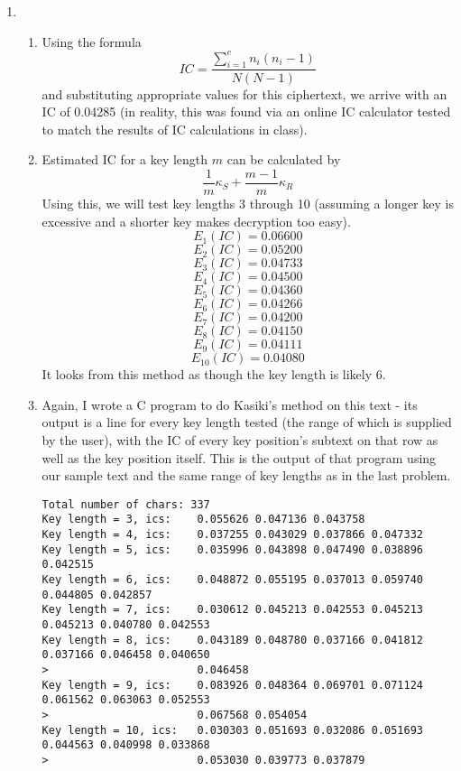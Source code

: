 \documentclass[10pt,letterpaper]{article}
\begin{document}
\begin{enumerate}
    \item
    \begin{enumerate}
        \item
            Using the formula
            $$IC = \frac{\sum_{i=1}^{c}n_i(n_i-1)}{N(N-1)}$$
            and substituting appropriate values for this ciphertext, we arrive with an IC of 0.04285 (in reality, this was found via an online IC calculator tested to match the results of IC calculations in class).
        \item
            Estimated IC for a key length $m$ can be calculated by
                $$\frac{1}{m}\kappa_S + \frac{m-1}{m}\kappa_R$$
            Using this, we will test key lengths 3 through 10 (assuming a longer key is excessive and a shorter key makes decryption too easy).
                $$E_1(IC) = 0.06600$$
                $$E_2(IC) = 0.05200$$
                $$E_3(IC) = 0.04733$$
                $$E_4(IC) = 0.04500$$
                $$E_5(IC) = 0.04360$$
                $$E_6(IC) = 0.04266$$
                $$E_7(IC) = 0.04200$$
                $$E_8(IC) = 0.04150$$
                $$E_9(IC) = 0.04111$$
                $$E_{10}(IC) = 0.04080$$
            It looks from this method as though the key length is likely 6.
        \item
            Again, I wrote a C program to do Kasiki's method on this text - its output is a line for every key length tested (the range of which is supplied by the user), with the IC of every key position's subtext on that row as well as the key position itself.  This is the output of that program using our sample text and the same range of key lengths as in the last problem.
            \begin{verbatim}
Total number of chars: 337
Key length = 3, ics:    0.055626 0.047136 0.043758
Key length = 4, ics:    0.037255 0.043029 0.037866 0.047332
Key length = 5, ics:    0.035996 0.043898 0.047490 0.038896 0.042515
Key length = 6, ics:    0.048872 0.055195 0.037013 0.059740 0.044805 0.042857
Key length = 7, ics:    0.030612 0.045213 0.042553 0.045213 0.045213 0.040780 0.042553
Key length = 8, ics:    0.043189 0.048780 0.037166 0.041812 0.037166 0.046458 0.040650
>                       0.046458
Key length = 9, ics:    0.083926 0.048364 0.069701 0.071124 0.061562 0.063063 0.052553
>                       0.067568 0.054054
Key length = 10, ics:   0.030303 0.051693 0.032086 0.051693 0.044563 0.040998 0.033868
>                       0.053030 0.039773 0.037879
            \end{verbatim}


\end{enumerate}
\end{enumerate}
\end{document}
